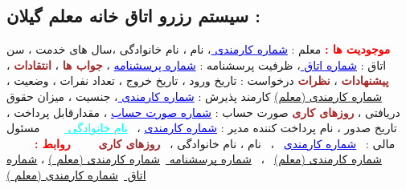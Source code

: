 \documentclass{article}
\begin{document}
\subsection*{سیستم رزرو اتاق خانه معلم گیلان  : }
 \textcolor{red}{\textbf{موجودیت ها  : }}
 \newline
 \newline
 معلم  : 
 \textcolor{blue}{\underline{شماره کارمندی }}
 ،
 نام ، نام خانوادگی ،‌سال های خدمت ، سن 
 \newline
\newline
اتاق : 
\textcolor{blue}{\underline{شماره اتاق  }}
،‌ ظرفیت 
\newline
\newline
پرسشنامه : 
\textcolor{blue}{\underline{شماره پرسشنامه}}
،
\textcolor{brown}{\textbf{جواب ها }}
،
\textcolor{brown}{\textbf{انتقادات }}
،
\textcolor{brown}{\textbf{پیشنهادات }}
،
\textcolor{brown}{\textbf{نظرات }}
\newline
\newline
درخواست   : تاریخ ورود ، تاریخ خروج ،‌ تعداد نفرات ،‌ وضعیت ،‌
\underline{شماره کارمندی (معلم)}
\newline
\newline
کارمند پذیرش  : 
\textcolor{blue}{\underline{شماره کارمندی }}
، 
جنسیت ، میزان حقوق دریافتی ، 
\textcolor{brown}{\textbf{روزهای کاری  }}
\newline
\newline
صورت حساب  : 
\textcolor{blue}{\underline{شماره صورت حساب}}
،
مقدارقابل پرداخت ،‌ تاریخ صدور ، نام پرداخت کننده 
\newline
\newline
مدیر : 
\textcolor{blue}{\underline{شماره کارمندی}}
، 
 \textcolor{cyan}{\underline{نام خانوادگی } }
 \newline
 \newline
 مسئول مالی : 
 \textcolor{blue}{\underline{شماره کارمندی}}
 ،
 نام ، نام خانوادگی ،‌
 \textcolor{brown}{\textbf{روزهای کاری  }}
 \newline
 \newline
 \textcolor{red}{\textbf{روابط : }}
 \newline
 \newline
  \underline{شماره کارمندی (معلم)}
 ، 
 \underline{شماره پرسشنامه }
\newline
\newline
{}
 \underline{شماره کارمندی (معلم )}
، 
\underline{شماره اتاق  }
\newline
\newline
{}
 \underline{شماره کارمندی (معلم )}
\end{document}
